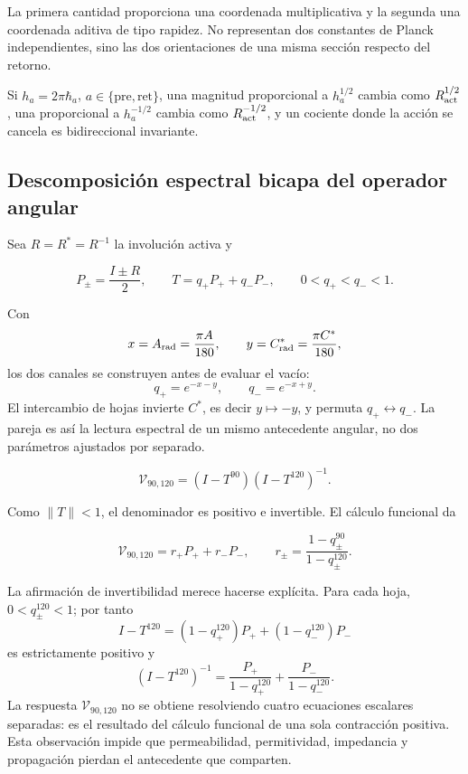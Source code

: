 La primera cantidad proporciona una coordenada multiplicativa y la segunda
una coordenada aditiva de tipo rapidez. No representan dos constantes de
Planck independientes, sino las dos orientaciones de una misma secci\'on
respecto del retorno.

Si \(h_a=2\pi\hbar_a\), \(a\in\{\mathrm{pre},\mathrm{ret}\}\), una magnitud proporcional a \(h_a^{1/2}\) cambia como \(R_{\rm act}^{1/2}\), una proporcional a \(h_a^{-1/2}\) cambia como \(R_{\rm act}^{-1/2}\), y un cociente donde la acci\'on se cancela es bidireccional invariante.

\subsection{Descomposici\'on espectral bicapa del operador angular}

Sea \(R=R^*=R^{-1}\) la involuci\'on activa y

\[
P_\pm=\frac{I\pm R}{2},
\qquad
T=q_+P_+ +q_-P_-,
\qquad 0<q_+<q_-<1.
\]

Con
\[
x=A_{\rm rad}=\frac{\pi A}{180},\qquad
y=C^*_{\rm rad}=\frac{\pi C^*}{180},
\]
los dos canales se construyen antes de evaluar el vac\'io:
\begin{equation}
q_+=e^{-x-y},\qquad q_-=e^{-x+y}.
\label{p12-83-c13-s1:eq:vacuum-angular-channels}
\end{equation}
El intercambio de hojas invierte \(C^*\), es decir \(y\mapsto-y\), y permuta \(q_+\leftrightarrow q_-\). La pareja es as\'i la lectura espectral de un mismo antecedente angular, no dos par\'ametros ajustados por separado.

\begin{definition}
\begin{equation}
\mathcal V_{90,120}=(I-T^{90})(I-T^{120})^{-1}.
\label{p12-83-c13-s1:eq:vacuum-operator}
\end{equation}
\end{definition}

Como \(\|T\|<1\), el denominador es positivo e invertible. El c\'alculo funcional da

\begin{equation}
\mathcal V_{90,120}=r_+P_+ +r_-P_-,
\qquad
r_\pm=\frac{1-q_\pm^{90}}{1-q_\pm^{120}}.
\label{p12-83-c13-s1:eq:vacuum-eigenvalues}
\end{equation}

La afirmaci\'on de invertibilidad merece hacerse expl\'icita. Para cada hoja,
\(0<q_\pm^{120}<1\); por tanto
\[
I-T^{120}=(1-q_+^{120})P_++(1-q_-^{120})P_-
\]
es estrictamente positivo y
\[
(I-T^{120})^{-1}
=\frac{P_+}{1-q_+^{120}}+
 \frac{P_-}{1-q_-^{120}}.
\]
La respuesta \(\mathcal V_{90,120}\) no se obtiene resolviendo cuatro
ecuaciones escalares separadas: es el resultado del c\'alculo funcional de una
sola contracci\'on positiva. Esta observaci\'on impide que permeabilidad,
permitividad, impedancia y propagaci\'on pierdan el antecedente que comparten.

